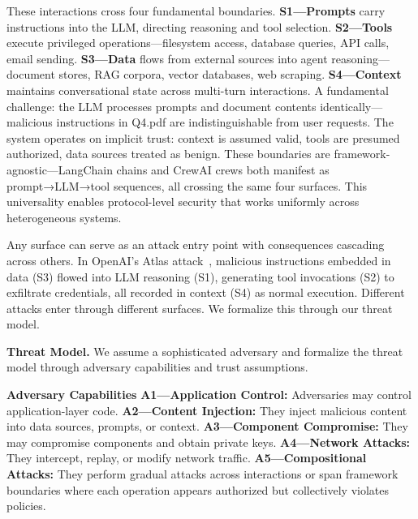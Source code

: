 These interactions cross four fundamental boundaries. \textbf{S1—Prompts} carry instructions into the LLM, directing reasoning and tool selection. \textbf{S2—Tools} execute privileged operations—filesystem access, database queries, API calls, email sending. \textbf{S3—Data} flows from external sources into agent reasoning—document stores, RAG corpora, vector databases, web scraping. \textbf{S4—Context} maintains conversational state across multi-turn interactions. A fundamental challenge: the LLM processes prompts and document contents identically—malicious instructions in Q4.pdf are indistinguishable from user requests. The system operates on implicit trust: context is assumed valid, tools are presumed authorized, data sources treated as benign. These boundaries are framework-agnostic—LangChain chains and CrewAI crews both manifest as prompt→LLM→tool sequences, all crossing the same four surfaces. This universality enables protocol-level security that works uniformly across heterogeneous systems.

  Any surface can serve as an attack entry point with consequences cascading across others. In OpenAI's Atlas attack~\cite{atlas-cve}, malicious instructions embedded in data (S3) flowed into LLM reasoning (S1), generating tool invocations (S2) to exfiltrate credentials, all recorded in context (S4) as normal execution. Different attacks enter through different surfaces. We formalize this through our threat model.


\noindent\textbf{Threat Model.}
\label{sec:threat-model}
We assume a sophisticated adversary and formalize the threat model through adversary capabilities and trust assumptions.

\textbf{Adversary Capabilities} \textbf{A1—Application Control:} Adversaries may control application-layer code. \textbf{A2—Content Injection:} They inject malicious content into data sources, prompts, or context. \textbf{A3—Component Compromise:} They may compromise components and obtain private keys. \textbf{A4—Network Attacks:} They intercept, replay, or modify network traffic. \textbf{A5—Compositional Attacks:} They perform gradual attacks across interactions or span framework boundaries where each operation appears authorized but collectively violates policies.

